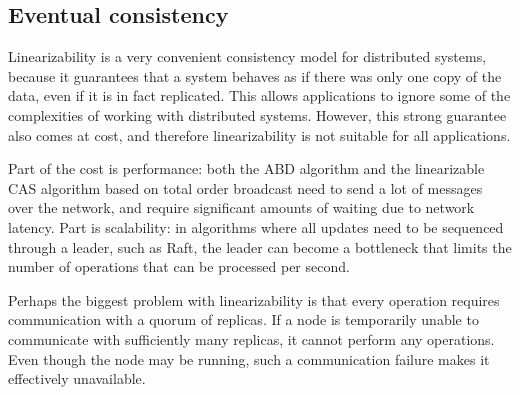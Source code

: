 {
}

\subsection{Eventual consistency}\label{sec:eventual-consistency}

Linearizability is a very convenient consistency model for distributed systems, because it guarantees that a system behaves as if there was only one copy of the data, even if it is in fact replicated.
This allows applications to ignore some of the complexities of working with distributed systems.
However, this strong guarantee also comes at cost, and therefore linearizability is not suitable for all applications.

Part of the cost is performance: both the ABD algorithm and the linearizable CAS algorithm based on total order broadcast need to send a lot of messages over the network, and require significant amounts of waiting due to network latency.
Part is scalability: in algorithms where all updates need to be sequenced through a leader, such as Raft, the leader can become a bottleneck that limits the number of operations that can be processed per second.

Perhaps the biggest problem with linearizability is that every operation requires communication with a quorum of replicas.
If a node is temporarily unable to communicate with sufficiently many replicas, it cannot perform any operations.
Even though the node may be running, such a communication failure makes it effectively unavailable.

